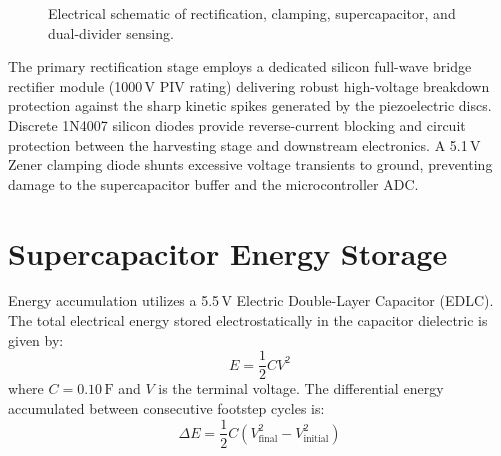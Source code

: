 \begin{figure}[H]
\caption{Electrical schematic of rectification, clamping, supercapacitor, and dual-divider sensing.}
\label{fig:circuit_diagram}
\end{figure}

The primary rectification stage employs a dedicated silicon full-wave bridge rectifier module (1000\,V PIV rating) delivering robust high-voltage breakdown protection against the sharp kinetic spikes generated by the piezoelectric discs. Discrete 1N4007 silicon diodes provide reverse-current blocking and circuit protection between the harvesting stage and downstream electronics. A 5.1\,V Zener clamping diode shunts excessive voltage transients to ground, preventing damage to the supercapacitor buffer and the microcontroller ADC.

\section{Supercapacitor Energy Storage}
Energy accumulation utilizes a 5.5\,V Electric Double-Layer Capacitor (EDLC). The total electrical energy stored electrostatically in the capacitor dielectric is given by:
\begin{equation}
E = \frac{1}{2} C V^2
\label{eq:cap_energy}
\end{equation}
where $C = 0.10\,\text{F}$ and $V$ is the terminal voltage. The differential energy accumulated between consecutive footstep cycles is:
\begin{equation}
\Delta E = \frac{1}{2} C \left(V_{\text{final}}^2 - V_{\text{initial}}^2\right)
\label{eq:delta_energy}
\end{equation}

